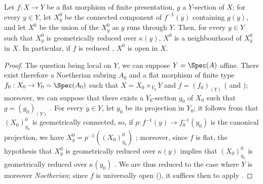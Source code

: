 \begin{corollary}[15.6.5]
\label{IV.15.6.5}
Let $f:X\to Y$ be a flat morphism of finite presentation, $g$ a $Y$-section of $X$; for every $y\in Y$, let $X_y^0$ be the connected component of $f^{-1}(y)$ containing $g(y)$, and let $X^0$ be the union of the $X_y^0$ as $y$ runs through $Y$.
Then, for every $y\in Y$ such that $X_y^0$ is geometrically reduced over $\kappa(y)$, $X^0$ is a neighbourhood of $X_y^0$ in $X$.
In particular, if $f$ is reduced , $X^0$ is open in $X$.
\end{corollary}

\begin{proof}
The question being local on $Y$, we can suppose $Y=\Spec(A)$ affine.
There exist therefore a Noetherian subring $A_0$ and a flat morphism of finite type $f_0:X_0\to Y_0=\Spec(A_0)$ such that $X=X_0\times_{Y_0}Y$ and $f=(f_0)_{(Y)}$ ( and ); moreover, we can suppose that there exists a $Y_0$-section $g_0$ of $X_0$ such that $g=(g_0)_{(Y)}$ .
For every $y\in Y$, let $y_0$ be its projection in $Y_0$; it follows from  that $(X_0)_{y_0}^0$ is geometrically connected, so, if $p:f^{-1}(y)\to f_0^{-1}(y_0)$ is the canonical projection, we have $X_y^0=p^{-1}((X_0)_{y_0}^0)$ ; moreover, since $f$ is flat, the hypothesis that $X_y^0$ is geometrically reduced over $\kappa(y)$ implies that $(X_0)_{y_0}^0$ is geometrically reduced over $\kappa(y_0)$ .
We are thus reduced to the case where
$Y$ is moreover \emph{Noetherian}; since $f$ is universally open (), it suffices then to apply .
\end{proof}


